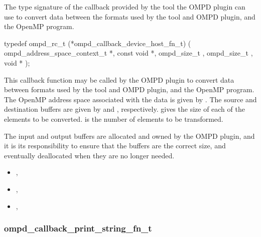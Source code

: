 \label{ompd:ompd_callback_device_host_fn_t}

\summary

The type signature of the callback provided by the tool the
OMPD plugin can use to convert data between the formats used by the
tool and OMPD plugin, and the OpenMP program.


\cspecificstart
\begin{ompSyntax}
typedef ompd_rc_t (*ompd_callback_device_host_fn_t) (
  ompd_address_space_context_t *,
  const void *,
  ompd_size_t                    ,
  ompd_size_t                    ,
  void *
);
\end{ompSyntax}
\cspecificend

\descr
This callback function may be called by the OMPD plugin to convert
data between formats used by the tool and OMPD plugin, and the OpenMP program.
\argdesc
The OpenMP address space associated with the data is given by
.
The source and destination buffers are given by 
and , respectively.
 gives the size of each of the elements to be converted.
 is the number of elements to be transformed.

The input and output buffers are allocated and owned by the OMPD plugin,
and it is its responsibility to ensure that the buffers are the correct
size, and eventually deallocated when they are no longer needed.

\crossreferences
\begin{itemize}
\item
  , 
\item
  , 
\item
  , 
\end{itemize}

\subsubsection{ompd\_callback\_print\_string\_fn\_t}
\label{ompd:ompd_callback_print_string_fn_t}

